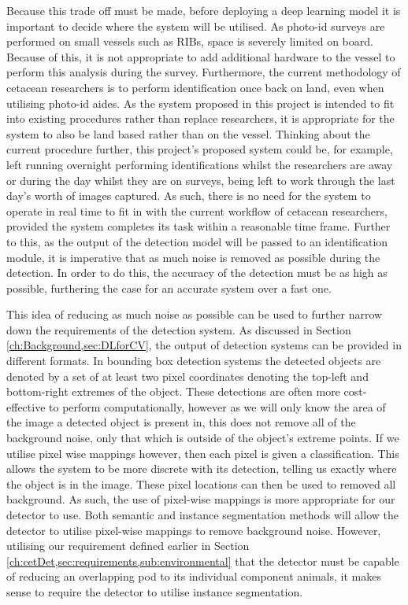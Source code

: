  Because this trade off must be made, before deploying a deep learning model it is important to decide where the system will be utilised. As photo-id surveys are performed on small vessels such as RIBs, space is severely limited on board. Because of this, it is not appropriate to add additional hardware to the vessel to perform this analysis during the survey. Furthermore, the current methodology of cetacean researchers is to perform identification once back on land, even when utilising photo-id aides. As the system proposed in this project is intended to fit into existing procedures rather than replace researchers, it is appropriate for the system to also be land based rather than on the vessel. Thinking about the current procedure further, this project's proposed system could be, for example, left running overnight performing identifications whilst the researchers are away or during the day whilst they are on surveys, being left to work through the last day's worth of images captured. As such, there is no need for the system to operate in real time to fit in with the current workflow of cetacean researchers, provided the system completes its task within a reasonable time frame. Further to this, as the output of the detection model will be passed to an identification module, it is imperative that as much noise is removed as possible during the detection. In order to do this, the accuracy of the detection must be as high as possible, furthering the case for an accurate system over a fast one.
 
 This idea of reducing as much noise as possible can be used to further narrow down the requirements of the detection system. As discussed in Section \ref{ch:Background,sec:DLforCV}, the output of detection systems can be provided in different formats. In bounding box detection systems the detected objects are denoted by a set of at least two pixel coordinates denoting the top-left and bottom-right extremes of the object. These detections are often more cost-effective to perform computationally, however as we will only know the area of the image a detected object is present in, this does not remove all of the background noise, only that which is outside of the object's extreme points. If we utilise pixel wise mappings however, then each pixel is given a classification. This allows the system to be more discrete with its detection, telling us exactly where the object is in the image. These pixel locations can then be used to removed all background. As such, the use of pixel-wise mappings is more appropriate for our detector to use. Both semantic and instance segmentation methods will allow the detector to utilise pixel-wise mappings to remove background noise. However, utilising our requirement defined earlier in Section \ref{ch:cetDet,sec:requirements,sub:environmental} that the detector must be capable of reducing an overlapping pod to its individual component animals, it makes sense to require the detector to utilise instance segmentation.
 
